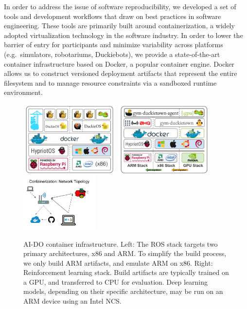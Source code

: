 \documentclass[12pt,initial,twoside,maitrise]{dms}
\numberwithin{equation}{section}
\numberwithin{table}{chapter}
\numberwithin{figure}{chapter}
\begin{document}
In order to address the issue of software reproducibility, we developed a set of tools and development workflows that draw on best practices in software engineering. These tools are primarily built around containerization, a widely adopted virtualization technology in the software industry. In order to lower the barrier of entry for participants and minimize variability across platforms (e.g.\ simulators, robotariums, Duckiebots), we provide a state-of-the-art container infrastructure based on Docker, a popular container engine. Docker allows us to construct versioned deployment artifacts that represent the entire filesystem and to manage resource constraints via a sandboxed runtime environment.

\begin{figure}[ht]
    \centering
    \includegraphics[width=0.45\textwidth]{docker_stack_1.png}
    \includegraphics[width=0.45\textwidth]{docker_stack_2.png}
    \includegraphics[width=0.35\textwidth]{network_infra.png}
    \caption{AI-DO container infrastructure. Left: The ROS stack targets two primary architectures, x86 and ARM. To simplify the build process, we only build ARM artifacts, and emulate ARM on x86. Right: Reinforcement learning stack. Build artifacts are typically trained on a GPU, and transferred to CPU for evaluation. Deep learning models, depending on their specific architecture, may be run on an ARM device using an Intel NCS.}
    \label{fig:docker}
\end{figure}
\end{document}
